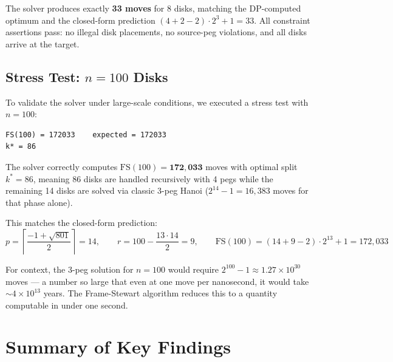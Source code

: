 \documentclass[12pt, a4paper]{article}
\begin{document}
The solver produces exactly \textbf{33 moves} for 8 disks, matching the DP-computed optimum and the closed-form prediction $(4 + 2 - 2) \cdot 2^3 + 1 = 33$.
All constraint assertions pass: no illegal disk placements, no source-peg violations, and all disks arrive at the target.

\subsection{Stress Test: $n = 100$ Disks}

To validate the solver under large-scale conditions, we executed a stress test with $n = 100$:

\begin{lstlisting}[style=output, caption={Stress test result for $n = 100$}]
FS(100) = 172033    expected = 172033
k* = 86
\end{lstlisting}

The solver correctly computes $\text{FS}(100) = \mathbf{172{,}033}$ moves with optimal split $k^* = 86$, meaning 86 disks are handled recursively with 4 pegs while the remaining 14 disks are solved via classic 3-peg Hanoi ($2^{14} - 1 = 16{,}383$ moves for that phase alone).

This matches the closed-form prediction:
\[
    p = \left\lceil \frac{-1 + \sqrt{801}}{2} \right\rceil = 14, \qquad
    r = 100 - \frac{13 \cdot 14}{2} = 9, \qquad
    \text{FS}(100) = (14 + 9 - 2) \cdot 2^{13} + 1 = 172{,}033
\]

For context, the 3-peg solution for $n = 100$ would require $2^{100} - 1 \approx 1.27 \times 10^{30}$ moves — a number so large that even at one move per nanosecond, it would take $\sim 4 \times 10^{13}$ years. The Frame-Stewart algorithm reduces this to a quantity computable in under one second.


\section{Summary of Key Findings}
\label{sec:summary}
\end{document}
